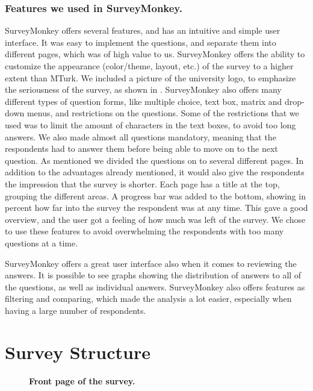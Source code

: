 \subsubsection{Features we used in SurveyMonkey.}
SurveyMonkey offers several features, and has an intuitive and simple user interface. It was easy to implement the questions, and separate them into different pages, which was of high value to us. SurveyMonkey offers the ability to customize the appearance (color/theme, layout, etc.) of the survey to a higher extent than MTurk. We included a picture of the university logo, to emphasize the seriousness of the survey, as shown in . SurveyMonkey also offers many different types of question forms, like multiple choice, text box, matrix and drop-down menus, and restrictions on the questions. Some of the restrictions that we used was to limit the amount of characters in the text boxes, to avoid too long answers. We also made almost all questions mandatory, meaning that the respondents had to answer them before being able to move on to the next question. As mentioned we divided the questions on to several different pages. In addition to the advantages already mentioned, it would also give the respondents the impression that the survey is shorter. Each page has a title at the top, grouping the different areas. A progress bar was added to the bottom, showing in percent how far into the survey the respondent was at any time. This gave a good overview, and the user got a feeling of how much was left of the survey. We chose to use these features to avoid overwhelming the respondents with too many questions at a time. 

SurveyMonkey offers a great user interface also when it comes to reviewing the answers. It is possible to see graphs showing the distribution of answers to all of the questions, as well as individual answers. SurveyMonkey also offers features as filtering and comparing, which made the analysis a lot easier, especially when having a large number of respondents. 

\section{Survey Structure} 

\begin{figure}[t]
\centering
{}
\caption[Front page of the survey]{\textbf{Front page of the survey.}} 
\label{fig:frontpage}
\end{figure}

